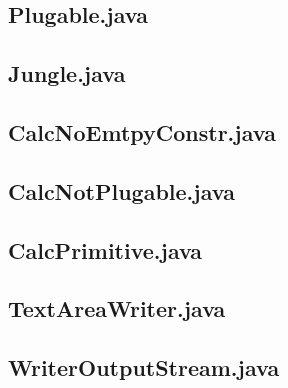 \documentclass[a4paper, 12pt]{article}
\begin{document}
\subsection{Plugable.java}\label{plugable.java}
\begin{footnotesize}

\end{footnotesize}
\newpage

\subsection{Jungle.java}
\begin{footnotesize}

\end{footnotesize}
\newpage

\subsection{CalcNoEmtpyConstr.java}\label{cnec}
\begin{footnotesize}

\end{footnotesize}
\newpage

\subsection{CalcNotPlugable.java}\label{cnp}
\begin{footnotesize}

\end{footnotesize}
\newpage

\subsection{CalcPrimitive.java}\label{cp}
\begin{footnotesize}

\end{footnotesize}
\newpage

\subsection{TextAreaWriter.java}\label{taw}
\begin{footnotesize}

\end{footnotesize}
\newpage

\subsection{WriterOutputStream.java}\label{wos}
\begin{footnotesize}

\end{footnotesize}
\end{document}
